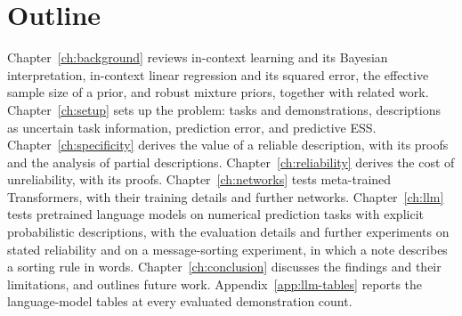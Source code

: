 \section{Outline}\label{sec:outline}

Chapter~\ref{ch:background} reviews in-context learning and its Bayesian interpretation, in-context linear regression and its squared error, the effective sample size of a prior, and robust mixture priors, together with related work. Chapter~\ref{ch:setup} sets up the problem: tasks and demonstrations, descriptions as uncertain task information, prediction error, and predictive ESS. Chapter~\ref{ch:specificity} derives the value of a reliable description, with its proofs and the analysis of partial descriptions. Chapter~\ref{ch:reliability} derives the cost of unreliability, with its proofs. Chapter~\ref{ch:networks} tests meta-trained Transformers, with their training details and further networks. Chapter~\ref{ch:llm} tests pretrained language models on numerical prediction tasks with explicit probabilistic descriptions, with the evaluation details and further experiments on stated reliability and on a message-sorting experiment, in which a note describes a sorting rule in words. Chapter~\ref{ch:conclusion} discusses the findings and their limitations, and outlines future work. Appendix~\ref{app:llm-tables} reports the language-model tables at every evaluated demonstration count.
